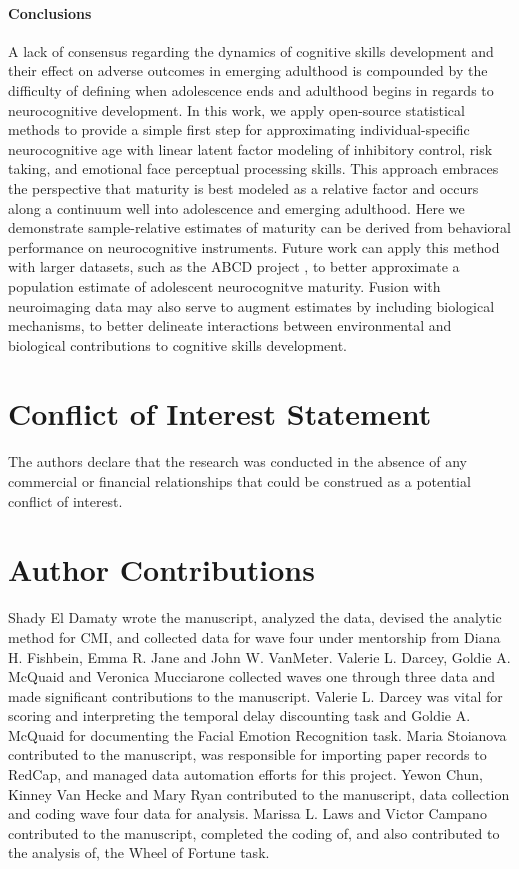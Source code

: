 \documentclass{article}%
\begin{document}
\paragraph*{Conclusions} A lack of consensus regarding the dynamics of cognitive skills development and their effect on adverse outcomes in emerging adulthood is compounded by the difficulty of defining when adolescence ends and adulthood begins in regards to neurocognitive development. In this work, we apply open-source statistical methods to provide a simple first step for approximating individual-specific neurocognitive age with linear latent factor modeling of inhibitory control, risk taking, and emotional face perceptual processing skills.  This approach embraces the perspective that maturity is best modeled as a relative factor and occurs along a continuum well into adolescence and emerging adulthood. Here we demonstrate sample-relative estimates of maturity can be derived from behavioral performance on neurocognitive instruments. Future work can apply this method with larger datasets, such as the ABCD project \citep{casey2018adolescent,volkow2018conception}, to better approximate a population estimate of adolescent neurocognitve maturity. Fusion with neuroimaging data may also serve to augment estimates by including biological mechanisms, to better delineate interactions between environmental and biological contributions to cognitive skills development.

\section*{Conflict of Interest Statement}
The authors declare that the research was conducted in the absence of any commercial or financial relationships that could be construed as a potential conflict of interest.

\section*{Author Contributions}
Shady El Damaty wrote the manuscript, analyzed the data, devised the analytic method for CMI, and collected data for wave four under mentorship from Diana H. Fishbein, Emma R. Jane and John W. VanMeter. Valerie L. Darcey, Goldie A. McQuaid and Veronica Mucciarone collected waves one through three data and made significant contributions to the manuscript. Valerie L. Darcey was vital for scoring and interpreting the temporal delay discounting task and Goldie A. McQuaid for documenting the Facial Emotion Recognition task. Maria Stoianova contributed to the manuscript, was responsible for importing paper records to RedCap, and managed data automation efforts for this project. Yewon Chun, Kinney Van Hecke and Mary Ryan contributed to the manuscript, data collection and coding wave four data for analysis. Marissa L. Laws and Victor Campano contributed to the manuscript, completed the coding of, and also contributed to the analysis of, the Wheel of Fortune task.
\end{document}
